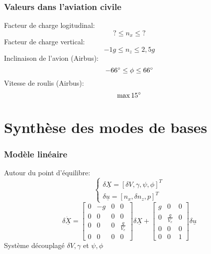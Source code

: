 \documentclass[tikz, footheight=2em]{beamer}
\begin{document}

\begin{frame}
    \frametitle{Valeurs dans l'aviation civile}\pause{}
    Facteur de charge logitudinal:
    \[
    ? \le n_x \le ?
    \]\pause{}
    Facteur de charge vertical:
    \[
    -1g \le n_z \le 2,5g
    \]\pause{}
    Inclinaison de l'avion (Airbus):
    \[
    -66\degree \le \phi \le 66\degree
    \] \pause{}
    Vitesse de roulis (Airbus):
    \[
    \max 15\degree
    \]
\end{frame}


\section{Synthèse des modes de bases}


\begin{frame}
    \frametitle{Modèle linéaire} \pause{}
    Autour du point d'équilibre:
    \[
    \left \{
    \begin{array}{c}
        \delta{} \underline{X} = {[\delta V, \gamma, \psi, \phi]}^{T} \\
        \delta{} \underline{u} = {[n_x, \delta n_z, p]}^{T}
    \end{array}
    \right.
    \]
    \[
    \delta \dot{\underline{X}}
    =
    \left[
    \begin{array}{cccc}
        0 & -g & 0 & 0 \\
        0 & 0 & 0 & 0 \\
        0 & 0 & 0 & \frac{g}{V_e} \\
        0 & 0 & 0 & 0
    \end{array}
    \right]
    \delta{} \underline{X}
    +
    \left[
    \begin{array}{cccc}
        g & 0 & 0 \\
        0 & \frac{g}{V_e} & 0 \\
        0 & 0 & 0 \\
        0 & 0 & 1
    \end{array}
    \right]
    \delta{} \underline{u}
    \] \pause{}
    Système découplagé \( \delta V, \gamma \) et \( \psi, \phi \)
\end{frame}
\end{document}
